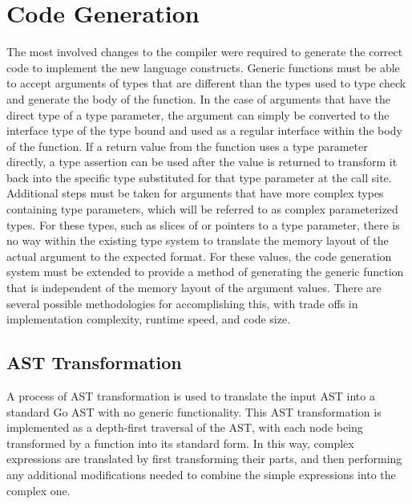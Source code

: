 \documentclass[letterpaper,twocolumn,11pt]{article}
\begin{document}
\section{Code Generation} \label{code_generation}

The most involved changes to the compiler were required to generate the correct code to implement the new language constructs. Generic functions must be able to accept arguments of types that are different than the types used to type check and generate the body of the function. In the case of arguments that have the direct type of a type parameter, the argument can simply be converted to the interface type of the type bound and used as a regular interface within the body of the function. If a return value from the function uses a type parameter directly, a type assertion can be used after the value is returned to transform it back into the specific type substituted for that type parameter at the call site. Additional steps must be taken for arguments that have more complex types containing type parameters, which will be referred to as complex parameterized types. For these types, such as slices of or pointers to a type parameter, there is no way within the existing type system to translate the memory layout of the actual argument to the expected format. For these values, the code generation system must be extended to provide a method of generating the generic function that is independent of the memory layout of the argument values. There are several possible methodologies for accomplishing this, with trade offs in implementation complexity, runtime speed, and code size. 

\subsection{AST Transformation} \label{ast_transformation}

A process of AST transformation is used to translate the input AST into a standard Go AST with no generic functionality. This AST transformation is implemented as a depth-first traversal of the AST, with each node being transformed by a function into its standard form. In this way, complex expressions are translated by first transforming their parts, and then performing any additional modifications needed to combine the simple expressions into the complex one.
\end{document}
